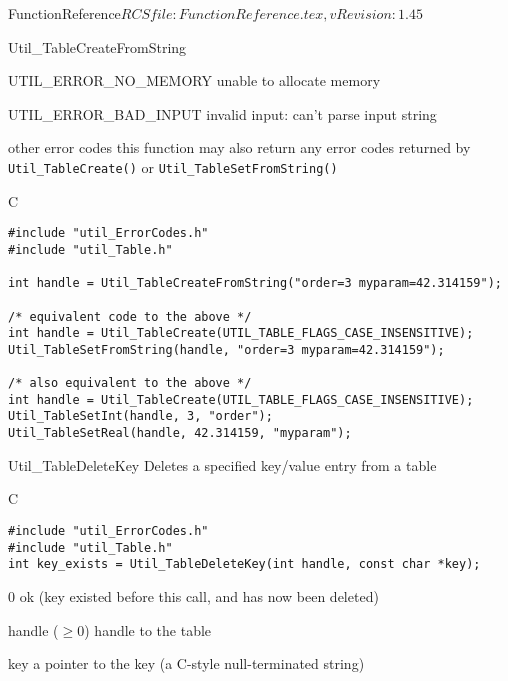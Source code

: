 \begin{cactuspart}{5}{FunctionReference}{$RCSfile: FunctionReference.tex,v $}{$Revision: 1.45 $}
\begin{FunctionDescription}{Util\_TableCreateFromString}
\begin{Error}{UTIL\_ERROR\_NO\_MEMORY}
unable to allocate memory
\end{Error}
\begin{Error}{UTIL\_ERROR\_BAD\_INPUT}
invalid input: can't parse input string
\end{Error}
\begin{Error}{\rm other error codes}
this function may also return any error codes returned by
\verb|Util_TableCreate()| or \verb|Util_TableSetFromString()|
\end{Error}

\begin{Example}{C}
\begin{verbatim}
#include "util_ErrorCodes.h"
#include "util_Table.h"

int handle = Util_TableCreateFromString("order=3 myparam=42.314159");

/* equivalent code to the above */
int handle = Util_TableCreate(UTIL_TABLE_FLAGS_CASE_INSENSITIVE);
Util_TableSetFromString(handle, "order=3 myparam=42.314159");

/* also equivalent to the above */
int handle = Util_TableCreate(UTIL_TABLE_FLAGS_CASE_INSENSITIVE);
Util_TableSetInt(handle, 3, "order");
Util_TableSetReal(handle, 42.314159, "myparam");
\end{verbatim}
\end{Example}
\end{FunctionDescription}


\begin{FunctionDescription}{Util\_TableDeleteKey}
\label{Util-TableDeleteKey}
Deletes a specified key/value entry from a table

\begin{Synopsis}{C}
\begin{verbatim}
#include "util_ErrorCodes.h"
#include "util_Table.h"
int key_exists = Util_TableDeleteKey(int handle, const char *key);
\end{verbatim}
\end{Synopsis}

\begin{Result}{\rm 0}
ok (key existed before this call, and has now been deleted)
\end{Result}

\begin{Parameter}{handle ($\ge 0$)}
handle to the table
\end{Parameter}
\begin{Parameter}{key}
a pointer to the key (a C-style null-terminated string)
\end{Parameter}


\end{FunctionDescription}
\end{cactuspart}

